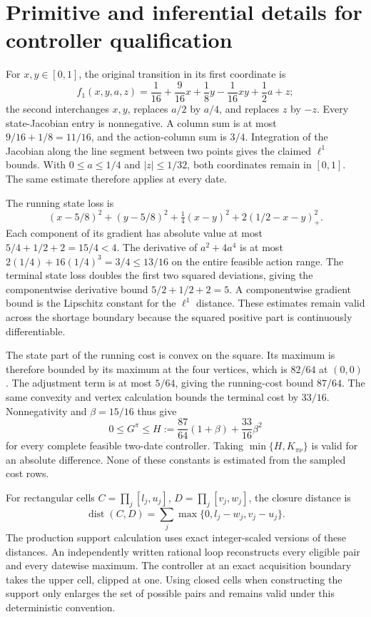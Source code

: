 \section{Primitive and inferential details for controller qualification}\label{supp:displacement75}
For $x,y\in[0,1]$, the original transition in its first coordinate is
\[
 f_1(x,y,a,z)=\frac1{16}+\frac9{16}x+\frac18y-\frac1{16}xy+\frac12a+z;
\]
the second interchanges $x,y$, replaces $a/2$ by $a/4$, and replaces $z$ by $-z$. Every state-Jacobian entry is nonnegative. A column sum is at most $9/16+1/8=11/16$, and the action-column sum is $3/4$. Integration of the Jacobian along the line segment between two points gives the claimed $\ell^1$ bounds. With $0\le a\le1/4$ and $|z|\le1/32$, both coordinates remain in $[0,1]$. The same estimate therefore applies at every date.

The running state loss is
\[
 (x-5/8)^2+(y-5/8)^2+\tfrac14(x-y)^2+2(1/2-x-y)_+^2.
\]
Each component of its gradient has absolute value at most $5/4+1/2+2=15/4<4$. The derivative of $a^2+4a^4$ is at most $2(1/4)+16(1/4)^3=3/4\le13/16$ on the entire feasible action range. The terminal state loss doubles the first two squared deviations, giving the componentwise derivative bound $5/2+1/2+2=5$. A componentwise gradient bound is the Lipschitz constant for the $\ell^1$ distance. These estimates remain valid across the shortage boundary because the squared positive part is continuously differentiable.

The state part of the running cost is convex on the square. Its maximum is therefore bounded by its maximum at the four vertices, which is $82/64$ at $(0,0)$. The adjustment term is at most $5/64$, giving the running-cost bound $87/64$. The same convexity and vertex calculation bounds the terminal cost by $33/16$. Nonnegativity and $\beta=15/16$ thus give
\[
 0\le G^\pi\le H:=\frac{87}{64}(1+\beta)+\frac{33}{16}\beta^2
\]
for every complete feasible two-date controller. Taking $\min\{H,K_{\pi\nu}\}$ is valid for an absolute difference. None of these constants is estimated from the sampled cost rows.

For rectangular cells $C=\prod_j[l_j,u_j]$, $D=\prod_j[v_j,w_j]$, the closure distance is
\[
 \operatorname{dist}(C,D)=\sum_j\max\{0,l_j-w_j,v_j-u_j\}.
\]
The production support calculation uses exact integer-scaled versions of these distances. An independently written rational loop reconstructs every eligible pair and every datewise maximum. The controller at an exact acquisition boundary takes the upper cell, clipped at one. Using closed cells when constructing the support only enlarges the set of possible pairs and remains valid under this deterministic convention.

